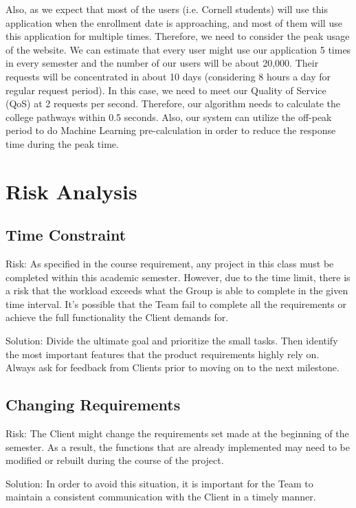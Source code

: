 \documentclass{article}
\begin{document}
\vspace{0.4cm}Also, as we expect that most of the users (i.e. Cornell students) will use this application when the enrollment date is approaching, and most of them will use this application for multiple times. Therefore, we need to consider the peak usage of the website. We can estimate that every user might use our application 5 times in every semester and the number of our users will be about 20,000. Their requests will be concentrated in about 10 days (considering 8 hours a day for regular request period). In this case, we need to meet our Quality of Service (QoS) at 2 requests per second. Therefore, our algorithm needs to calculate the college pathways within 0.5 seconds. Also, our system can utilize the off-peak period to do Machine Learning pre-calculation in order to reduce the response time during the peak time.

\section{Risk Analysis}
\subsection{Time Constraint}
Risk: As specified in the course requirement, any project in this class must be completed within this academic semester. However, due to the time limit, there is a risk that the workload exceeds what the Group is able to complete in the given time interval. It’s possible that the Team fail to complete all the requirements or achieve the full functionality the Client demands for.

\vspace{0.4cm}Solution: Divide the ultimate goal and prioritize the small tasks. Then identify the most important features that the product requirements highly rely on. Always ask for feedback from Clients prior to moving on to the next milestone.

\subsection{Changing Requirements}
Risk: The Client might change the requirements set made at the beginning of the semester. As a result, the functions that are already implemented may need to be modified or rebuilt during the course of the project.

\vspace{0.4cm}Solution: In order to avoid this situation, it is important for the Team to maintain a consistent communication with the Client in a timely manner.
\end{document}
